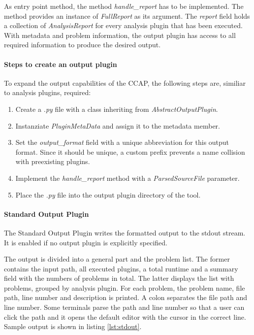 As entry point method, the method \textit{handle\_report} has to be implemented. The method provides an instance of \textit{FullReport} as its argument. The  \textit{report} field holds a collection of  \textit{AnalysisReport} for every analysis plugin that has been executed. With metadata and problem information, the output plugin has access to all required information to produce the desired output.

\paragraph{Steps to create an output plugin}
To expand the output capabilities of the CCAP, the following steps are, similiar to analysis plugins, required:
\begin{enumerate}
    \item Create a \textit{.py} file with a class inheriting from \textit{AbstractOutputPlugin}.
    \item Instanziate \textit{PluginMetaData} and assign it to the metadata member.
    \item Set the \textit{output\_format} field with a unique abbreviation for this output format. Since it should be unique, a custom prefix prevents a name collision with preexisting plugins.
    \item Implement the \textit{handle\_report} method with a \textit{ParsedSourceFile} parameter. 
    \item Place the \textit{.py} file into the output plugin directory of the tool.
\end{enumerate}

\paragraph{Standard Output Plugin}
The Standard Output Plugin writes the formatted output to the stdout stream. It is enabled if no output plugin is explicitly specified. 

The output is divided into a general part and the problem list. The former contains the input path, all executed plugins, a total runtime and a summary field with the numbers of problems in total. The latter displays the list with problems, grouped by analysis plugin.  
For each problem, the problem name, file path, line number and description is printed. A colon separates the file path and line number. Some terminals parse the path and line number so that a user can click the path and it opens the default editor with the cursor in the correct line. Sample output is shown in listing \ref{lst:stdout}.


